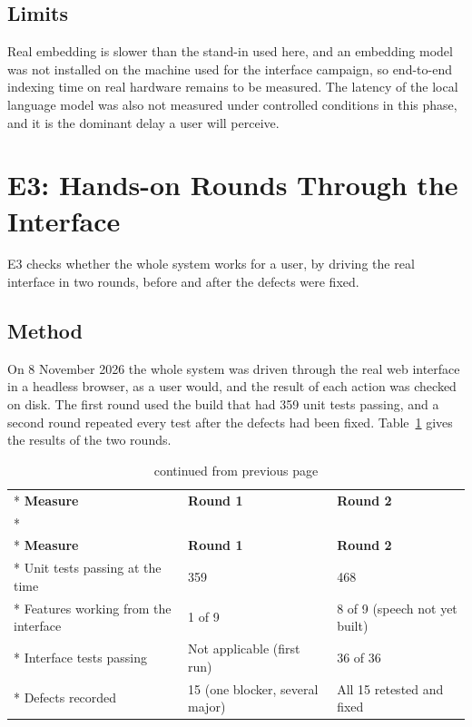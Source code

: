 \documentclass{FastFyp}
\begin{document}
\subsection{Limits}
Real embedding is slower than the stand-in used here, and an embedding model was not installed on the machine used for the interface campaign, so end-to-end indexing time on real hardware remains to be measured. The latency of the local language model was also not measured under controlled conditions in this phase, and it is the dominant delay a user will perceive.


\section{E3: Hands-on Rounds Through the Interface}
E3 checks whether the whole system works for a user, by driving the real interface in two rounds, before and after the defects were fixed.

\subsection{Method}
On 8 November 2026 the whole system was driven through the real web interface in a headless browser, as a user would, and the result of each action was checked on disk. The first round used the build that had 359 unit tests passing, and a second round repeated every test after the defects had been fixed. Table~\ref{tab:rounds} gives the results of the two rounds.


{
\begin{longtable}{|p{5.3cm}|p{3.7cm}|p{3.7cm}|}
\caption{Results of the two hands-on rounds.}\label{tab:rounds}\\*
\hline
\textbf{Measure} & \textbf{Round 1} & \textbf{Round 2} \\*
\hline
\endfirsthead
\caption[]{continued from previous page}\\*
\hline
\textbf{Measure} & \textbf{Round 1} & \textbf{Round 2} \\*
\hline
\endhead
\hline
Unit tests passing at the time & 359 & 468 \\*
\hline
Features working from the interface & 1 of 9 & 8 of 9 (speech not yet built) \\*
\hline
Interface tests passing & Not applicable (first run) & 36 of 36 \\*
\hline
Defects recorded & 15 (one blocker, several major) & All 15 retested and fixed \\
\hline
\end{longtable}
}
\end{document}
